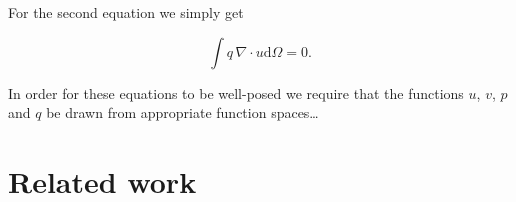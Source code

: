 \documentclass[thesis]{subfiles}
\begin{document}
For the second equation we simply get

\begin{equation}
  \int q \, \nabla \cdot u \textrm{d}\Omega = 0.
\end{equation}

In order for these equations to be well-posed we require that the functions $u$, $v$, $p$ and $q$ be drawn from appropriate function spaces\dots








\section{Related work}  %

\end{document}
